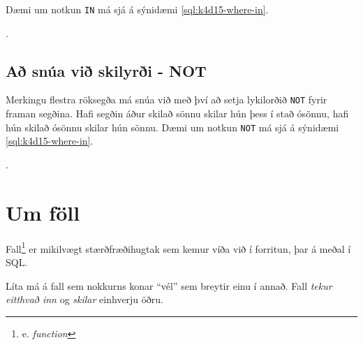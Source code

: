 Dæmi um notkun \verb|IN| má sjá á sýnidæmi \ref{sql:k4d15-where-in}.

\begin{example}
\caption[WHERE með IN]{Tvær \emph{SELECT} skipanir sem gera sama hlutinn. Þær finna báðar nemendurna með númerin 1, 3, 5 og 7. Seinni skipunin er þó töluvert skárri!}
\label{sql:k4d15-where-in}.
\centering
{}
\end{example}
\subsection{Að snúa við skilyrði - NOT}
Merkingu flestra röksegða má snúa við með því að setja lykilorðið \verb|NOT| fyrir framan segðina. Hafi segðin áður skilað sönnu skilar hún þess í stað ósönnu, hafi hún skilað ósönnu skilar hún sönnu. Dæmi um notkun \verb|NOT| má sjá á sýnidæmi \ref{sql:k4d15-where-in}.

\begin{example}
\caption[NOT lykilorðið]{\emph{SELECT} skipun sem finnur alla nemendur sem \emph{ekki} byrja á stafnum \emph{``K''}.}
\label{sql:k4d16-not}.
\centering
{}
\end{example}
\section{Um föll}
\label{undirkafli:foll}
Fall\footnote{e. \emph{function}} er mikilvægt stærðfræðihugtak sem kemur víða við í forritun, þar á meðal í SQL.

Líta má á fall sem nokkurns konar ``vél'' sem breytir einu í annað. Fall \emph{tekur eitthvað inn} og \emph{skilar} einhverju öðru.

